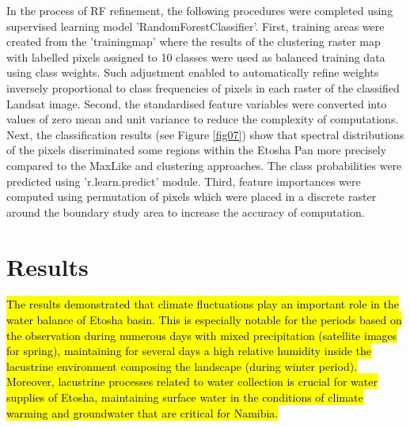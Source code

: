 \documentclass[climate,article,submit,pdftex,moreauthors]{Definitions/mdpi}
\begin{document}
In the process of RF refinement, the following procedures were completed using supervised learning model 'RandomForestClassifier'. First, training areas were created from the 'trainingmap' where the results of the clustering raster map with labelled pixels assigned to 10 classes were used as balanced training data using class weights. Such adjustment enabled to automatically refine weights inversely proportional to class frequencies of pixels in each raster of the classified Landsat image. Second, the standardised feature variables were converted into values of zero mean and unit variance to reduce the complexity of computations. Next, the classification results (see Figure \ref{fig07}) show that spectral distributions of the pixels discriminated some regions within the Etosha Pan more precisely compared to the MaxLike and clustering approaches. The class probabilities were predicted using 'r.learn.predict' module. Third, feature importances were computed using permutation of pixels which were placed in a discrete raster around the boundary study area  to increase the accuracy of computation. 

\pagebreak
\section{Results}

\hl{The results demonstrated that climate fluctuations play an important role in the water balance of Etosha basin. This is especially notable for the periods based on the observation during numerous days with mixed precipitation (satellite images for spring), maintaining for several days a high relative humidity inside the lacustrine environment composing the landscape (during winter period). Moreover, lacustrine processes related to water collection is crucial for water supplies of Etosha, maintaining surface water in the conditions of climate warming and groundwater that are critical for Namibia.} 
\end{document}
